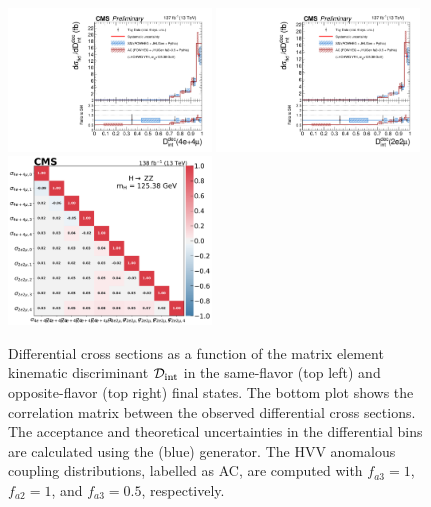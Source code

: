 \clearpage

\begin{center}
	\begin{figure}[!htb]
		\centering
		\includegraphics[width=0.48\textwidth]{Images/H4L/discriminants/model_v4/Dint_unfoldwith_4l_SM_125_asimov.pdf}
		\includegraphics[width=0.48\textwidth]{Images/H4L/discriminants/model_v4/Dint_unfoldwith_2e2mu_SM_125_asimov.pdf}\\
		\includegraphics[width=0.48\textwidth]{Images/H4L/correlations/corr_Dint_v4.pdf}\\
		\caption{
			Differential cross sections as a function of the matrix element kinematic discriminant ${\mathcal D}_{\text{int}}$ in the same-flavor (top left) and opposite-flavor (top right)  final states.
			The bottom plot shows the correlation matrix between the observed differential cross sections.
			The acceptance and theoretical uncertainties in the differential bins are calculated using the \POWHEG (blue) generator.
			The HVV anomalous coupling distributions, labelled as AC, are computed with $f_{a3} = 1$, $f_{a2} = 1$, and $f_{a3} = 0.5$, respectively.
			\label{fig:fidDINT}}
	\end{figure}
\end{center}


